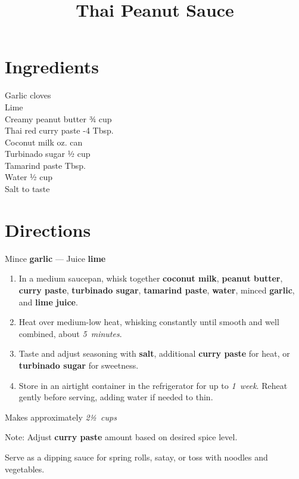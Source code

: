 \documentclass[11pt,letterpaper]{article}
\title{Thai Peanut Sauce}
\author{}
\date{}
\begin{document}
\maketitle
\thispagestyle{empty}

\section*{Ingredients}
\setlength{\columnsep}{20pt}
\begin{multicols}{2}
\noindent
    Garlic cloves  \\
    Lime  \\
    Creamy peanut butter \dotfill ¾ cup \\
    Thai red curry paste -4 Tbsp. \\
    \columnbreak
    Coconut milk  oz. can \\
    Turbinado sugar \dotfill ½ cup \\
    Tamarind paste  Tbsp. \\
    Water \dotfill ½ cup \\
    Salt \dotfill to taste \\
\end{multicols}

\section*{Directions}

\noindent
Mince \textbf{garlic} ---
Juice \textbf{lime}

\begin{enumerate}
    \item In a medium saucepan, whisk together \textbf{coconut milk}, \textbf{peanut butter}, \textbf{curry paste}, \textbf{turbinado sugar}, \textbf{tamarind paste}, \textbf{water}, minced \textbf{garlic}, and \textbf{lime juice}.
    
    \item Heat over medium-low heat, whisking constantly until smooth and well combined, about \textit{5~minutes}.
    
    \item Taste and adjust seasoning with \textbf{salt}, additional \textbf{curry paste} for heat, or \textbf{turbinado sugar} for sweetness.
    
    \item Store in an airtight container in the refrigerator for up to \textit{1~week}. Reheat gently before serving, adding water if needed to thin.
\end{enumerate}

Makes approximately \textit{2½~cups}

Note: Adjust \textbf{curry paste} amount based on desired spice level.

Serve as a dipping sauce for spring rolls, satay, or toss with noodles and vegetables.
\end{document}
